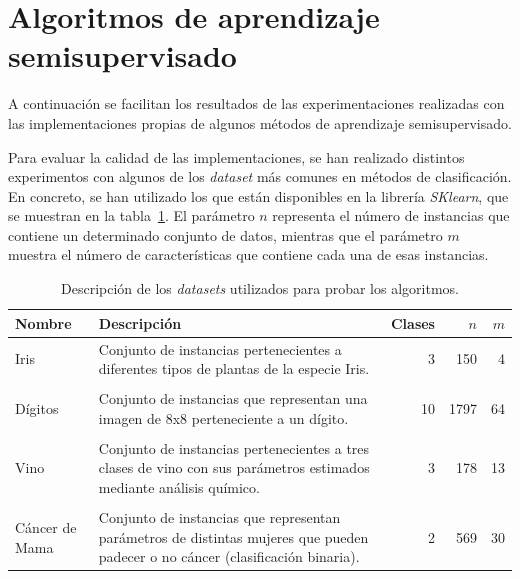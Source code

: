 
\section{Algoritmos de aprendizaje semisupervisado}

A continuación se facilitan los resultados de las experimentaciones realizadas con las implementaciones propias de algunos métodos de aprendizaje semisupervisado.

Para evaluar la calidad de las implementaciones, se han realizado distintos experimentos con algunos de los \textit{dataset} más comunes en métodos de clasificación. En concreto, se han utilizado los que están disponibles en la librería \textit{SKlearn}, que se muestran en la tabla~\ref{tabla_datasets_sklearn}. El parámetro $n$ representa el número de instancias que contiene un determinado conjunto de datos, mientras que el parámetro $m$ muestra el número de características que contiene cada una de esas instancias.

\begin{table}
	\small
	\begin{centering}
		\begin{tabular}{@{}p{4em} p{20em} r r r @{}}
			\toprule
			\textbf{Nombre} & \textbf{Descripción} & \textbf{Clases} & $n$ & $m$\\ 
			\midrule
			
			Iris & Conjunto de instancias pertenecientes a diferentes tipos de plantas de la especie Iris. & 3 & 150 & 4 \\\\
			Dígitos & Conjunto de instancias que representan una imagen de 8x8 perteneciente a un dígito. & 10 & 1797 & 64 \\\\
			Vino & Conjunto de instancias pertenecientes a tres clases de vino con sus parámetros estimados mediante análisis químico. & 3 & 178 & 13 \\\\
			Cáncer de Mama & Conjunto de instancias que representan parámetros de distintas mujeres que pueden padecer o no cáncer (clasificación binaria). & 2 & 569 & 30 \\
			\bottomrule
		\end{tabular}
	\end{centering}
	\caption{Descripción de los \textit{datasets} utilizados para probar los algoritmos.}
	\label{tabla_datasets_sklearn}	
\end{table}



